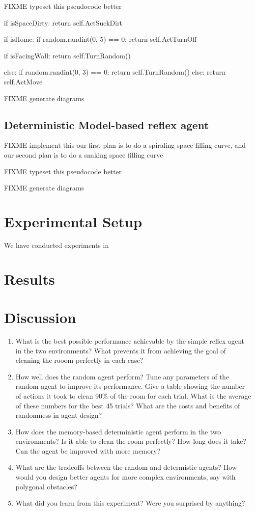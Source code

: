 \documentclass{article}
\begin{document}
FIXME typeset this pseudocode better

	if isSpaceDirty:
		return self.ActSuckDirt

	if isHome:
		if random.randint(0, 5) == 0:
			return self.ActTurnOff

	if isFacingWall:
		return self.TurnRandom()

	else:
		if random.randint(0, 3) == 0:
			return self.TurnRandom()
		else:
			return self.ActMove

FIXME generate diagrams


\subsection{Deterministic Model-based reflex agent}
FIXME implement this
our first plan is to do a spiraling space filling curve, and our second plan is to do a snaking space filling curve


FIXME typeset this pseudocode better



FIXME generate diagrams





\section{Experimental Setup}
We have conducted experiments in 

\section{Results}

\section{Discussion}
\begin{enumerate}
\item What is the best possible performance achievable by the simple reflex agent in the two environments? 
What prevents it from achieving the goal of cleaning the rooom perfectly in each case? 


\item How well does the random agent perform? 
Tune any parameters of the random agent to improve its performance. 
Give a table showing the number of actions it took to clean 90\% of the room for each trial. 
What is the average of these numbers for the best 45 trials? 
What are the costs and benefits of randomness in agent design? 

\item How does the memory-based deterministic agent perform in the two environments?
Is it able to clean the room perfectly? 
How long does it take? 
Can the agent be improved with more memory?

\item What are the tradeoffs between the random and determistic agents? 
How would you design better agents for more complex environments, say with polygonal obstacles? 

\item What did you learn from this experiment? 
Were you surprised by anything? 

\end{enumerate}
\end{document}
